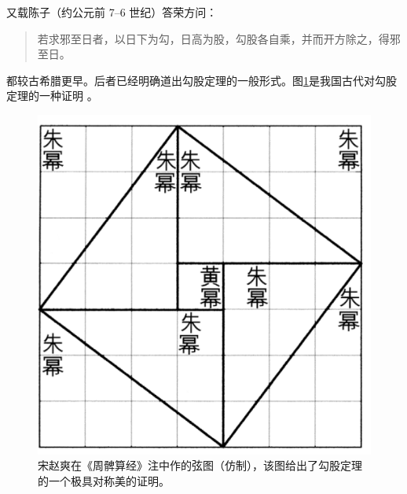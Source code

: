 \documentclass[UTF8] {ctexart}
\newenvironment{myquote}            %
{\begin{quote}\kaishu\zihao{-5}}    %
{\end{quote}}                       %
\begin{document}
又载陈子（约公元前 7--6 世纪）答荣方问：
\begin{myquote}
若求邪至日者，以日下为勾，日高为股，勾股各自乘，并而开方除之，得邪至日。
\end{myquote}
都较古希腊更早。后者已经明确道出勾股定理的一般形式。图\ref{fig:xiantu}是我国古代对勾股定理的一种证明 \cite{quanjing}。    %
\begin{figure}[ht]  %
    \centering  %
    \includegraphics[scale=0.6]{image_xiantu.png}
    \caption{\kaishu 宋赵爽在《周髀算经》注中作的弦图（仿制），该图给出了勾股定理的一个极具对称美的证明\cite{quanjing}。} %
    \label{fig:xiantu}  %
\end{figure}
\end{document}
